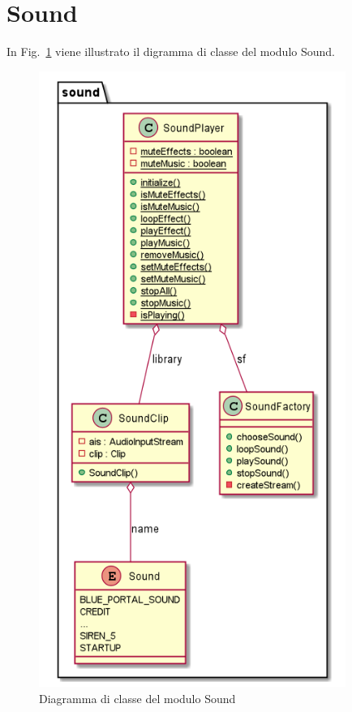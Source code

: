 \documentclass[12pt,a4paper]{report}
\begin{document}

\section{Sound}\label{se:arch.sound}
In Fig.~\ref{fig:sound} viene illustrato il digramma di classe del modulo Sound.\newline

\begin{figure}[tbp]
\begin{center}
  \includegraphics[width= 10cm]{sound}
\end{center}
  \caption{Diagramma di classe del modulo Sound}
  \label{fig:sound}
\end{figure}
\end{document}
